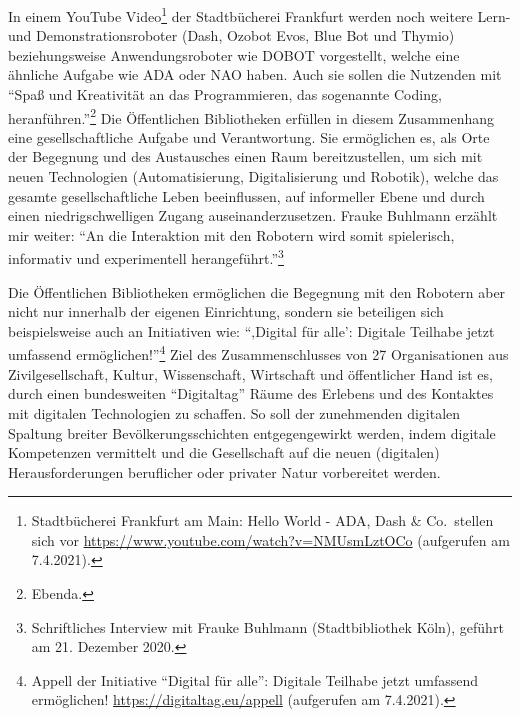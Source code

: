 \documentclass[a4paper,
fontsize=11pt,
oneside,
numbers=noperiodatend,
parskip=half-,
bibliography=totoc,
final
]{scrartcl}
\begin{document}
In einem YouTube Video\footnote{Stadtbücherei Frankfurt am Main: Hello
  World - ADA, Dash \& Co.~stellen sich vor
  \url{https://www.youtube.com/watch?v=NMUsmLztOCo} (aufgerufen am
  7.4.2021).} der Stadtbücherei Frankfurt werden noch weitere Lern- und
Demonstrationsroboter (Dash, Ozobot Evos, Blue Bot und Thymio)
beziehungsweise Anwendungsroboter wie DOBOT vorgestellt, welche eine
ähnliche Aufgabe wie ADA oder NAO haben. Auch sie sollen die Nutzenden
mit \enquote{Spaß und Kreativität an das Programmieren, das sogenannte
Coding, heranführen.}\footnote{Ebenda.} Die Öffentlichen Bibliotheken
erfüllen in diesem Zusammenhang eine gesellschaftliche Aufgabe und
Verantwortung. Sie ermöglichen es, als Orte der Begegnung und des
Austausches einen Raum bereitzustellen, um sich mit neuen Technologien
(Automatisierung, Digitalisierung und Robotik), welche das gesamte
gesellschaftliche Leben beeinflussen, auf informeller Ebene und durch
einen niedrigschwelligen Zugang auseinanderzusetzen. Frauke Buhlmann
erzählt mir weiter: \enquote{An die Interaktion mit den Robotern wird
somit spielerisch, informativ und experimentell
herangeführt.}\footnote{Schriftliches Interview mit Frauke Buhlmann
  (Stadtbibliothek Köln), geführt am 21. Dezember 2020.}

Die Öffentlichen Bibliotheken ermöglichen die Begegnung mit den Robotern
aber nicht nur innerhalb der eigenen Einrichtung, sondern sie beteiligen
sich beispielsweise auch an Initiativen wie: \enquote{‚Digital für
alle': Digitale Teilhabe jetzt umfassend ermöglichen!}\footnote{Appell
  der Initiative \enquote{Digital für alle}: Digitale Teilhabe jetzt
  umfassend ermöglichen! \url{https://digitaltag.eu/appell} (aufgerufen
  am 7.4.2021).} Ziel des Zusammenschlusses von 27 Organisationen aus
Zivilgesellschaft, Kultur, Wissenschaft, Wirtschaft und öffentlicher
Hand ist es, durch einen bundesweiten \enquote{Digitaltag} Räume des
Erlebens und des Kontaktes mit digitalen Technologien zu schaffen. So
soll der zunehmenden digitalen Spaltung breiter Bevölkerungsschichten
entgegengewirkt werden, indem digitale Kompetenzen vermittelt und die
Gesellschaft auf die neuen (digitalen) Herausforderungen beruflicher
oder privater Natur vorbereitet werden.
\end{document}
